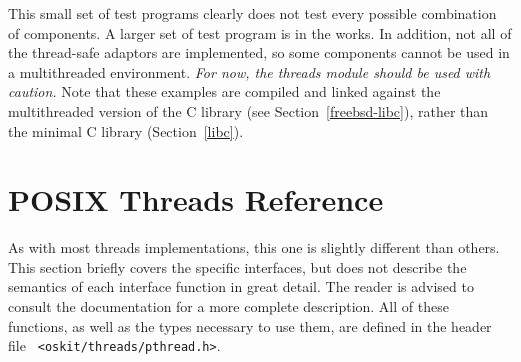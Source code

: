 This small set of test programs clearly does not test every possible
combination of components. A larger set of test program is in the works. In
addition, not all of the thread-safe adaptors are implemented, so some
components cannot be used in a multithreaded environment. \emph{For now, the
\posix{} threads module should be used with caution.} Note that these
examples are compiled and linked against the multithreaded version of the
\freebsd{} C library (see Section~\ref{freebsd-libc}), rather than the minimal
C library (Section~\ref{libc}).

\section{POSIX Threads Reference}
\label{pthread-api}

As with most \posix{} threads implementations, this one is slightly
different than others. This section briefly covers the specific interfaces,
but does not describe the semantics of each interface function in great
detail. The reader is advised to consult the \posix{} documentation for a
more complete description. All of these functions, as well as the types
necessary to use them, are defined in the header file {\tt
<oskit/threads/pthread.h>}.

